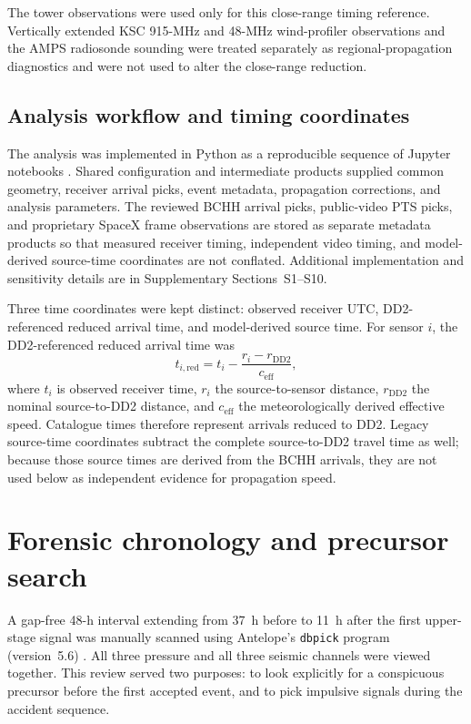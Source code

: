 \documentclass[]{seismica}
\begin{document}
The tower observations were used only for this close-range timing reference.
Vertically extended KSC 915-MHz and 48-MHz wind-profiler observations and the
AMPS radiosonde sounding were treated separately as regional-propagation
diagnostics and were not used to alter the close-range reduction.

\subsection{Analysis workflow and timing coordinates}

The analysis was implemented in Python as a reproducible sequence of Jupyter
notebooks \citep{kluyver2016jupyter}. Shared configuration and intermediate
products supplied common geometry, receiver arrival picks, event metadata,
propagation corrections, and analysis parameters. The reviewed BCHH arrival
picks, public-video PTS picks, and proprietary SpaceX frame observations are
stored as separate metadata products so that measured receiver timing, independent video timing, and
model-derived source-time coordinates are not conflated. Additional
implementation and sensitivity details are in Supplementary Sections~S1--S10.

Three time coordinates were kept distinct: observed receiver UTC,
DD2-referenced reduced arrival time, and model-derived source time. For sensor
$i$, the DD2-referenced reduced arrival time was
\begin{equation}
 t_{i,\mathrm{red}}=t_i-\frac{r_i-r_{\mathrm{DD2}}}{c_{\mathrm{eff}}},
 \label{eq:reduced_time}
\end{equation}
where $t_i$ is observed receiver time, $r_i$ the source-to-sensor distance,
$r_{\mathrm{DD2}}$ the nominal source-to-DD2 distance, and
$c_{\mathrm{eff}}$ the meteorologically derived effective speed. Catalogue
times therefore represent arrivals reduced to DD2. Legacy source-time
coordinates subtract the complete source-to-DD2 travel time as well; because
those source times are derived from the BCHH arrivals, they are not used below
as independent evidence for propagation speed.

\FloatBarrier


\section{Forensic chronology and precursor search}
\label{sec:precursor}

A gap-free 48-h interval extending from 37~h before to 11~h after the first
upper-stage signal was manually scanned using Antelope's \texttt{dbpick}
program (version~5.6) \citep{brtt_antelope}. All three pressure and all three
seismic channels were viewed together. This review served two purposes: to
look explicitly for a conspicuous precursor before the first accepted event,
and to pick impulsive signals during the accident sequence.
\end{document}
